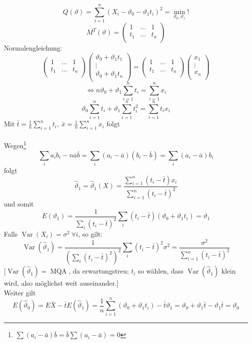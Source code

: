 \documentclass[a4paper,11pt,twoside,titlepage]{article}
\DeclareMathOperator{\var}{Var}
\DeclareMathOperator{\MQA}{MQA}
\begin{document}
$$ Q(\vartheta)=\sum_{i=1}^n(X_i-\vartheta_0-\vartheta_1t_i)^2=\min_{\vartheta_0,\vartheta_1}!$$
$$ M^T(\vartheta)=
\begin{pmatrix}
	1 & \ldots & 1\\
	t_1&\ldots & t_n\\
\end{pmatrix}$$
Normalengleichung: $$ 
\begin{pmatrix}
	1 & \ldots & 1\\
	t_1&\ldots & t_n\\
\end{pmatrix}
\begin{pmatrix}
	\vartheta_0+\vartheta_1t_1\\
	\vdots \\
	\vartheta_0+\vartheta_1t_n\\
\end{pmatrix}=
\begin{pmatrix}
	1 & \ldots & 1\\
	t_1&\ldots & t_n\\
\end{pmatrix}
\begin{pmatrix}
	x_1\\
	\vdots \\
	x_n\\
\end{pmatrix}$$
$$\Leftrightarrow n\vartheta_0+\vartheta_1\sum_{i=1}^nt_i=\sum_{i=1}^nx_i$$
$$\vartheta_0\sum_{i=1}^nt_i+\vartheta_1\sum_{i=1}^nt_i^2=\sum_{i=1}^nt_ix_i$$
Mit $\bar t=\frac1n\sum_{i=1}^nt_i,\ \bar{x}=\frac1n\sum_{i=1}^nx_i$ folgt\\
\\
Wegen\footnote{$\sum (a_i-\bar a)\bar b=\bar b\sum(a_i-\bar a)=0$} $$\sum_ia_ib_i-n\bar{a}\bar{b}=\sum_i(a_i-\bar{a})(b_i-\bar{b})=
\sum_i(a_i-\bar{a})b_i$$ folgt
$$\hat\vartheta_1=\hat\vartheta_1(X)=
\frac{\sum_{i=1}^n(t_i-\bar{t})x_i}{\sum_{i=1}^n(t_i-\bar{t})^2}$$
und somit 
$$E(\vartheta_1)=\frac{1}{\sum_i(t_i-\bar{t})^2}\sum_i(t_i-\bar{t})(\vartheta_0+\vartheta_1t_i)
=\vartheta_1$$
Falls $\var(X_i)=\sigma^2\ \forall i$, so gilt:
$$\var(\hat\vartheta_1)=\frac{1}{(\sum_i(t_i-\bar{t})^2)^2}\sum_i(t_i-\bar{t})^2\sigma^2=
\frac{\sigma^2}{\sum_{i=1}^n(t_i-\bar{t})^2}$$
[$\var(\hat\vartheta_1)=\MQA$, da erwartungstreu; $t_i$ so wählen, dass $\var(\hat\vartheta_1)$ klein wird, also möglichst weit auseinander.]\\
Weiter gilt $$E(\hat\vartheta_0)=E\bar{X}-\bar{t}E(\hat\vartheta_1)=
\frac1n\sum_{i=1}^n(\vartheta_0+\vartheta_1t_i)-\bar{t}\vartheta_1
=\vartheta_0+\vartheta_1\bar{t}-\vartheta_1\bar{t}=\vartheta_0$$
\end{document}
